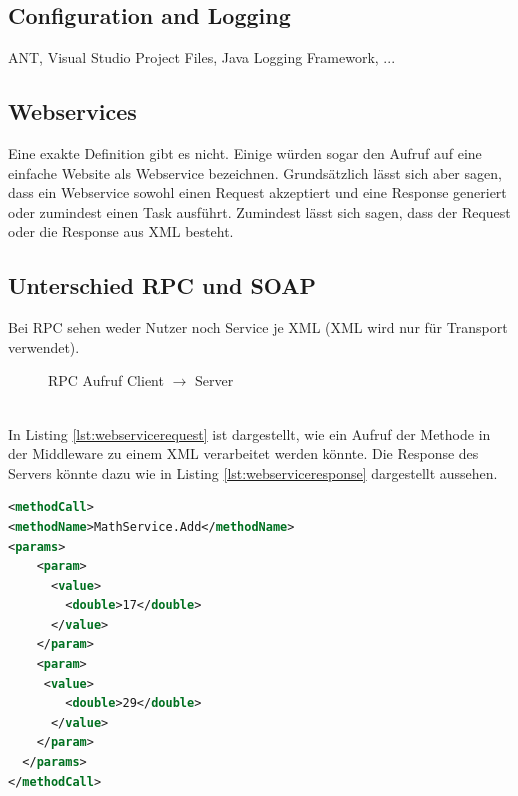 \subsection{Configuration and Logging}
ANT, Visual Studio Project Files, Java Logging Framework, ...
\subsection{Webservices}
Eine exakte Definition gibt es nicht. Einige würden sogar den Aufruf auf eine einfache Website als Webservice bezeichnen. Grundsätzlich lässt sich aber sagen, dass ein Webservice sowohl einen Request akzeptiert und eine Response generiert oder zumindest einen Task ausführt. Zumindest lässt sich sagen, dass der Request oder die Response aus XML besteht.

\subsection{Unterschied RPC und SOAP}
Bei RPC sehen weder Nutzer noch Service je XML (XML wird nur für Transport verwendet).
\begin{figure}[h!]
\centering
\small
{}
\caption{RPC Aufruf Client $\rightarrow$ Server}
\end{figure}
\\
In Listing \ref{lst:webservicerequest} ist dargestellt, wie ein Aufruf der Methode  in der Middleware zu einem XML verarbeitet werden könnte. Die Response des Servers könnte dazu wie in Listing \ref{lst:webserviceresponse} dargestellt aussehen.\\
\begin{minipage}{0.45\textwidth}
\begin{lstlisting}[language=XML, caption={Web Service Request}, label=lst:webservicerequest]
<methodCall> 
<methodName>MathService.Add</methodName> 
<params>
    <param>
      <value>
        <double>17</double>
      </value>
    </param>
    <param>
	 <value> 
		<double>29</double>
      </value>
    </param>
  </params>
</methodCall>
\end{lstlisting}
\end{minipage}

